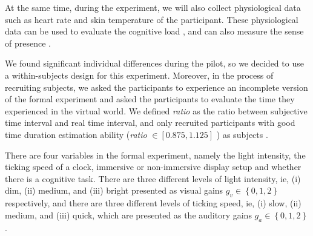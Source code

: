 \documentclass[sigconf]{acmart}
\begin{document}

At the same time, during the experiment, we will also collect physiological data such as heart rate and skin temperature of the participant. These physiological data can be used to evaluate the cognitive load \cite{kahneman1973attention}, and can also measure the sense of presence \cite{wiederhold2001investigation,riva20037,meehan2002physiological}.



We found significant individual differences during the pilot, so we decided to use a within-subjects design for this experiment. Moreover, in the process of recruiting subjects, we asked the participants to experience an incomplete version of the formal experiment and asked the participants to evaluate the time they experienced in the virtual world. We defined \emph{ratio} as the ratio between subjective time interval and real time interval, and only recruited participants with good time duration estimation ability (\emph{ratio} $\in[0.875,1.125]$ ) as subjects .


There are four variables in the formal experiment, namely the light intensity, the ticking speed of a clock, immersive or non-immersive display setup and whether there is a cognitive task. There are three different levels of light intensity, ie, (i) dim, (ii) medium, and (iii) bright presented as visual gains $g_v \in \left\{0, 1, 2\right\}$ respectively, and there are three different levels of ticking speed, ie, (i) slow, (ii) medium, and (iii) quick, which are presented as the auditory gains $g_a \in \left\{0, 1, 2\right\}$.
\end{document}
